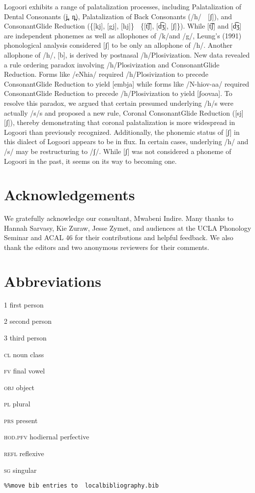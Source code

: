 \documentclass[output=paper]{langsci/langscibook}
\begin{document}
Logoori exhibits a range of palatalization processes, including Palatalization of Dental Consonants (j̪, n̪), Palatalization of Back Consonants (/h/  [ʃ]), and ConsonantGlide Reduction (\{[kj], [gj], [hj]\}  \{[t͡ʃ], [d͡ʒ], [ʃ]\}). While [t͡ʃ] and [d͡ʒ] are independent phonemes as well as allophones of /k/and /g/, Leung’s (1991) phonological analysis considered [ʃ] to be only an allophone of /h/. Another allophone of /h/, [b], is derived by postnasal /h/Plosivization. New data revealed a rule ordering paradox involving /h/Plosivization and ConsonantGlide Reduction. Forms like /eNhia/ required /h/Plosivization to precede ConsonantGlide Reduction to yield [embja] while forms like /N-hiov-aa/ required ConsonantGlide Reduction to precede /h/Plosivization to yield [ʃoovaa]. To resolve this paradox, we argued that certain presumed underlying /h/s were actually /s/s and proposed a new rule, Coronal ConsonantGlide Reduction ([sj]  [ʃ]), thereby demonstrating that coronal palatalization is more widespread in Logoori than previously recognized. Additionally, the phonemic status of [ʃ] in this dialect of Logoori appears to be in flux. In certain cases, underlying /h/ and /s/ may be restructuring to /ʃ/. While [ʃ] was not considered a phoneme of Logoori in the past, it seems on its way to becoming one.

\section{Acknowledgements} We gratefully acknowledge our consultant, Mwabeni Indire. Many thanks to Hannah Sarvasy, Kie Zuraw, Jesse Zymet, and audiences at the UCLA Phonology Seminar and ACAL 46 for their contributions and helpful feedback. We also thank the editors and two anonymous reviewers for their comments.

\section*{Abbreviations}

\textsc{1}    first person

\textsc{2}    second person

\textsc{3}    third person

\textsc{cl}    noun class

\textsc{fv}    final vowel

\textsc{obj}    object

\textsc{pl}    plural

\textsc{prs}    present

\textsc{hod.pfv}  hodiernal perfective

\textsc{refl}    reflexive

\textsc{sg}    singular
  

\begin{verbatim}%%move bib entries to  localbibliography.bib


\end{verbatim}
 

\printbibliography[heading=subbibliography,notkeyword=this]
\end{document}
